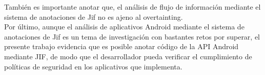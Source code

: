 También es importante anotar que, el análisis de flujo de información mediante
el sistema de anotaciones de Jif no es ajeno al overtainting.\\

Por último, aunque el análisis de aplicativos Android mediante el sistema de
anotaciones de Jif es un tema de investigación con bastantes retos por superar,
el presente trabajo evidencia que es posible anotar código de la API Android
mediante JIF, de modo que el desarrollador pueda verificar el cumplimiento de
políticas de seguridad en los aplicativos que implementa.

% 
% 
% 



